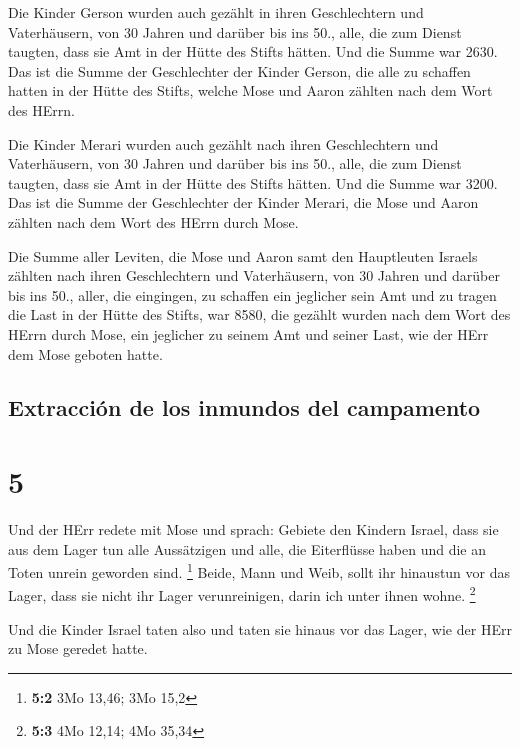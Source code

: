  Die Kinder Gerson wurden auch gezählt in ihren
Geschlechtern und Vaterhäusern,  von 30 Jahren und
darüber bis ins 50., alle, die zum Dienst taugten, dass sie Amt in der
Hütte des Stifts hätten.  Und die Summe war 2630.
 Das ist die Summe der Geschlechter der Kinder Gerson,
die alle zu schaffen hatten in der Hütte des Stifts, welche Mose und
Aaron zählten nach dem Wort des HErrn.

 Die Kinder Merari wurden auch gezählt nach ihren
Geschlechtern und Vaterhäusern,  von 30 Jahren und
darüber bis ins 50., alle, die zum Dienst taugten, dass sie Amt in der
Hütte des Stifts hätten.  Und die Summe war 3200.
 Das ist die Summe der Geschlechter der Kinder Merari,
die Mose und Aaron zählten nach dem Wort des HErrn durch Mose.

 Die Summe aller Leviten, die Mose und Aaron samt den
Hauptleuten Israels zählten nach ihren Geschlechtern und Vaterhäusern,
 von 30 Jahren und darüber bis ins 50., aller, die
eingingen, zu schaffen ein jeglicher sein Amt und zu tragen die Last in
der Hütte des Stifts,  war 8580,  die
gezählt wurden nach dem Wort des HErrn durch Mose, ein jeglicher zu
seinem Amt und seiner Last, wie der HErr dem Mose geboten hatte.

\hypertarget{extracciuxf3n-de-los-inmundos-del-campamento}{%
\subsection{Extracción de los inmundos del
campamento}\label{extracciuxf3n-de-los-inmundos-del-campamento}}

\hypertarget{section-4}{%
\section{5}\label{section-4}}

 Und der HErr redete mit Mose und sprach: 
Gebiete den Kindern Israel, dass sie aus dem Lager tun alle Aussätzigen
und alle, die Eiterflüsse haben und die an Toten unrein geworden sind.
\footnote{\textbf{5:2} 3Mo 13,46; 3Mo 15,2}  Beide, Mann
und Weib, sollt ihr hinaustun vor das Lager, dass sie nicht ihr Lager
verunreinigen, darin ich unter ihnen wohne. \footnote{\textbf{5:3} 4Mo
  12,14; 4Mo 35,34}

 Und die Kinder Israel taten also und taten sie hinaus vor
das Lager, wie der HErr zu Mose geredet hatte.

